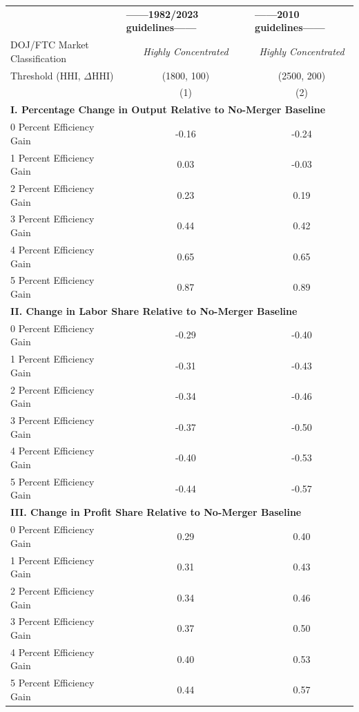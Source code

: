 \begin{tabular}{l @{\hspace{2em}} c @{\hspace{1.5em}}c}
\toprule
 & \multicolumn{1}{l}{\textbf{{------1982/2023 guidelines------ $\quad$ }}} & \multicolumn{1}{l}{\textbf{{------2010 guidelines------}}} \\ 
DOJ/FTC Market Classification & \textit{Highly Concentrated} & \textit{Highly Concentrated} \\ 
Threshold (HHI, $\Delta$HHI) & (1800, 100) & (2500, 200) \\ 
 & (1) & (2) \\ 
\midrule
\multicolumn{3}{l}{\textbf{I. Percentage Change in Output Relative to No-Merger Baseline}} \\ 
0 Percent Efficiency Gain & -0.16 & -0.24 \\ 
1 Percent Efficiency Gain & 0.03 & -0.03 \\ 
2 Percent Efficiency Gain & 0.23 & 0.19 \\ 
3 Percent Efficiency Gain & 0.44 & 0.42 \\ 
4 Percent Efficiency Gain & 0.65 & 0.65 \\ 
5 Percent Efficiency Gain & 0.87 & 0.89 \\ 
\midrule
\multicolumn{3}{l}{\textbf{II. Change in Labor Share Relative to No-Merger Baseline}} \\ 
0 Percent Efficiency Gain & -0.29 & -0.40 \\ 
1 Percent Efficiency Gain & -0.31 & -0.43 \\ 
2 Percent Efficiency Gain & -0.34 & -0.46 \\ 
3 Percent Efficiency Gain & -0.37 & -0.50 \\ 
4 Percent Efficiency Gain & -0.40 & -0.53 \\ 
5 Percent Efficiency Gain & -0.44 & -0.57 \\ 
\midrule
\multicolumn{3}{l}{\textbf{III. Change in Profit Share Relative to No-Merger Baseline}} \\ 
0 Percent Efficiency Gain & 0.29 & 0.40 \\ 
1 Percent Efficiency Gain & 0.31 & 0.43 \\ 
2 Percent Efficiency Gain & 0.34 & 0.46 \\ 
3 Percent Efficiency Gain & 0.37 & 0.50 \\ 
4 Percent Efficiency Gain & 0.40 & 0.53 \\ 
5 Percent Efficiency Gain & 0.44 & 0.57 \\ 
\bottomrule 
\end{tabular}
